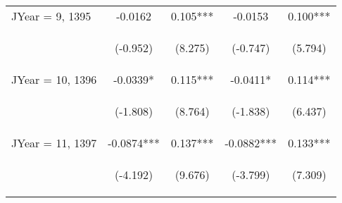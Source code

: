 \documentclass[]{standalone}
\begin{document}
\begin{tabular}{lcccc}
    JYear = 9, 1395  & -0.0162                                        & 0.105***                                       & -0.0153                                        & 0.100***                                       \\
    \vspace{4pt}     & \begin{footnotesize}(-0.952)\end{footnotesize} & \begin{footnotesize}(8.275)\end{footnotesize}  & \begin{footnotesize}(-0.747)\end{footnotesize} & \begin{footnotesize}(5.794)\end{footnotesize}  \\
    JYear = 10, 1396 & -0.0339*                                       & 0.115***                                       & -0.0411*                                       & 0.114***                                       \\
    \vspace{4pt}     & \begin{footnotesize}(-1.808)\end{footnotesize} & \begin{footnotesize}(8.764)\end{footnotesize}  & \begin{footnotesize}(-1.838)\end{footnotesize} & \begin{footnotesize}(6.437)\end{footnotesize}  \\
    JYear = 11, 1397 & -0.0874***                                     & 0.137***                                       & -0.0882***                                     & 0.133***                                       \\
    \vspace{4pt}     & \begin{footnotesize}(-4.192)\end{footnotesize} & \begin{footnotesize}(9.676)\end{footnotesize}  & \begin{footnotesize}(-3.799)\end{footnotesize} & \begin{footnotesize}(7.309)\end{footnotesize}  \\

\end{tabular}
\end{document}

